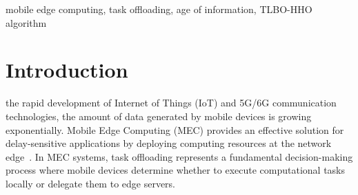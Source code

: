 \documentclass[conference]{IEEEtran}
\begin{document}
\begin{abstract}
\textbf{Mobile Edge Computing (MEC) emerges as a paradigm shift in distributed computing, bringing computational resources closer to end-users to support latency-sensitive and computation-intensive applications in 5G/6G networks. However, task offloading in MEC environments faces critical challenges: the inherent trade-offs between energy consumption and processing latency, the dynamic nature of wireless channels affecting transmission reliability, and the increasing demand for real-time information freshness in IoT applications. This work proposes a two-phase integrated Teaching-Learning-Based Optimization and Harris Hawks Optimization (TLBO-HHO) algorithm to address this tri-objective optimization problem. We establish an optimization model incorporating Age of Information (AoI) as a key metric for information freshness, prove its NP-hardness, and develop an adaptive switching mechanism that balances global exploration and local exploitation. Experimental results demonstrate that TLBO-HHO achieves fitness value improvements of 54.5\%, 63.5\%, and 76.2\% compared to three other existing mechanisms, while maintaining an average AoI of 1.68s through intelligent resource allocation strategies.}
\end{abstract}

\begin{IEEEkeywords}
mobile edge computing, task offloading, age of information, TLBO-HHO algorithm
\end{IEEEkeywords}

\section{Introduction}
 the rapid development of Internet of Things (IoT) and 5G/6G communication technologies, the amount of data generated by mobile devices is growing exponentially. Mobile Edge Computing (MEC) provides an effective solution for delay-sensitive applications by deploying computing resources at the network edge~\cite{mao2017survey}. In MEC systems, task offloading represents a fundamental decision-making process where mobile devices determine whether to execute computational tasks locally or delegate them to edge servers. 
\end{document}
